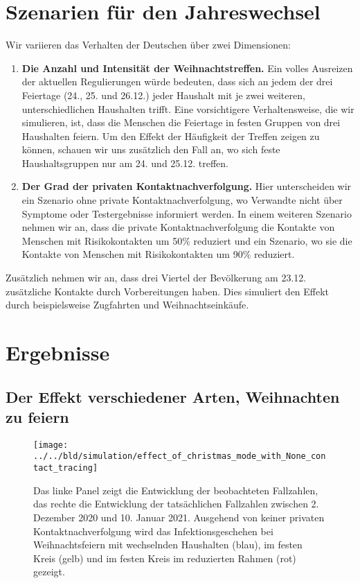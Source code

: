 \documentclass[a4paper,11pt,leqno,fleqn]{article}
\begin{document}
\section{Szenarien für den Jahreswechsel}

Wir variieren das Verhalten der Deutschen über zwei Dimensionen:

\begin{enumerate}
    \item \textbf{Die Anzahl und Intensität der Weihnachtstreffen.}
    Ein volles Ausreizen der aktuellen Regulierungen würde bedeuten, dass sich an jedem der drei Feiertage (24., 25. und 26.12.) jeder Haushalt mit je zwei weiteren, unterschiedlichen Haushalten trifft. Eine vorsichtigere Verhaltensweise, die wir simulieren, ist, dass die Menschen die Feiertage in festen Gruppen von drei Haushalten feiern. Um den Effekt der Häufigkeit der Treffen zeigen zu können, schauen wir uns zusätzlich den Fall an, wo sich feste Haushaltsgruppen nur am 24. und 25.12. treffen.
    \item \textbf{Der Grad der privaten Kontaktnachverfolgung.} Hier unterscheiden wir ein Szenario ohne private Kontaktnachverfolgung, wo Verwandte nicht über Symptome oder Testergebnisse informiert werden. In einem weiteren Szenario nehmen wir an, dass die private Kontaktnachverfolgung die Kontakte von Menschen mit Risikokontakten um 50\% reduziert und ein Szenario, wo sie die Kontakte von Menschen mit Risikokontakten um 90\% reduziert.
\end{enumerate}

Zusätzlich nehmen wir an, dass drei Viertel der Bevölkerung am 23.12. zusätzliche Kontakte durch Vorbereitungen haben. Dies simuliert den Effekt durch beispielsweise Zugfahrten und Weihnachtseinkäufe.

\FloatBarrier
\section{Ergebnisse}


\subsection{Der Effekt verschiedener Arten, Weihnachten zu feiern}

\begin{figure}
\label{fig:effect_of_christmas_without_contact_tracing}
\texttt{[image: ../../bld/simulation/effect\_of\_christmas\_mode\_with\_None\_contact\_tracing]}
\caption{
    Das linke Panel zeigt die Entwicklung der beobachteten Fallzahlen, das rechte die Entwicklung der tatsächlichen Fallzahlen zwischen 2. Dezember 2020 und 10. Januar 2021. Ausgehend von keiner privaten Kontaktnachverfolgung wird das Infektionsgeschehen bei Weihnachtsfeiern mit wechselnden Haushalten (blau), im festen Kreis (gelb) und im festen Kreis im reduzierten Rahmen (rot) gezeigt.
}
\end{figure}
\end{document}
